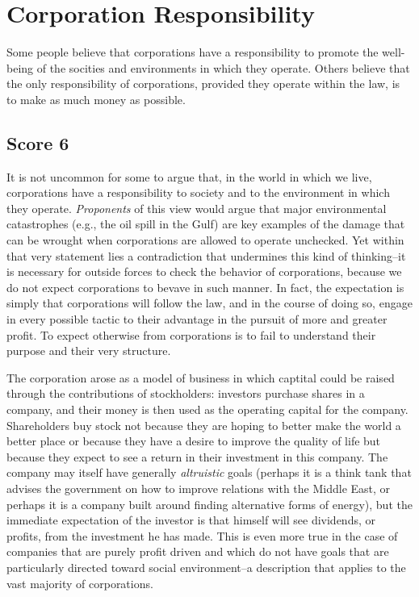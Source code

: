 \chapter{Corporation Responsibility}

Some people believe that corporations have a responsibility to promote the well-being of the socities and environments in which they operate.
Others believe that the only responsibility of corporations, provided they operate within the law, is to make as much money as possible.

\section{Score 6}
It is not uncommon for some to argue that, in the world in which we live, corporations have a responsibility to society and to the environment in which they operate.
\emph{Proponents} of this view would argue that major environmental catastrophes (e.g., the oil spill in the Gulf) are key examples of the damage that can be wrought when corporations are allowed to operate unchecked.
Yet within that very statement lies a contradiction that undermines this kind of thinking--it is necessary for outside forces to check the behavior of corporations, because we do not expect corporations to bevave in such manner.
In fact, the expectation is simply that corporations will follow the law, and in the course of doing so, engage in every possible tactic to their advantage in the pursuit of more and greater profit.
To expect otherwise from corporations is to fail to understand their purpose and their very structure.

The corporation arose as a model of business in which captital could be raised through the contributions of stockholders: investors purchase shares in a company, and their money is then used as the operating capital for the company.
Shareholders buy stock not because they are hoping to better make the world a better place or because they have a desire to improve the quality of life but because they expect to see a return in their investment in this company.
The company may itself have generally \emph{altruistic} goals (perhaps it is a think tank that advises the government on how to improve relations with the Middle East, or perhaps it is a company built around finding alternative forms of energy), but the immediate expectation of the investor is that himself will see dividends, or profits, from the investment he has made.
This is even more true in the case of companies that are purely profit driven and which do not have goals that are particularly directed toward social environment--a description that applies to the vast majority of corporations.

